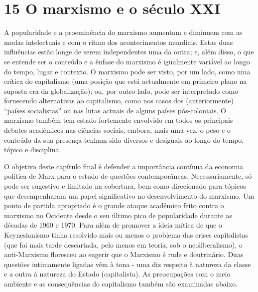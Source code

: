 \chapter{15 O marxismo e o século XXI}\label{15 O marxismo e o século XXI}
 \par 
A popularidade e a proeminência do marxismo aumentam e diminuem com as modas intelectuais e com o ritmo dos acontecimentos mundiais. Estas duas influências estão longe de serem independentes uma da outra; e, além disso, o que se entende ser o conteúdo e a ênfase do marxismo é igualmente variável ao longo do tempo, lugar e contexto. O marxismo pode ser visto, por um lado, como uma crítica do capitalismo (uma posição que está actualmente em primeiro plano na suposta era da globalização); ou, por outro lado, pode ser interpretado como fornecendo alternativas ao capitalismo, como nos casos dos (anteriormente) “países socialistas” ou nas lutas actuais de alguns países pós-coloniais. O marxismo também tem estado fortemente envolvido em todos os principais debates académicos nas ciências sociais, embora, mais uma vez, o peso e o conteúdo da sua presença tenham sido diversos e desiguais ao longo do tempo, tópico e disciplina.
 \par 
O objetivo deste capítulo final é defender a importância contínua da economia política de Marx para o estudo de questões contemporâneas. Necessariamente, só pode ser sugestivo e limitado na cobertura, bem como direcionado para tópicos que desempenharam um papel significativo no desenvolvimento do marxismo. Um ponto de partida apropriado é o grande ataque académico feito contra o marxismo no Ocidente desde o seu último pico de popularidade durante as décadas de 1960 e 1970. Para além de promover a ideia mítica de que o Keynesianismo tinha resolvido mais ou menos o problema das crises capitalistas (que foi mais tarde descartada, pelo menos em teoria, sob o neoliberalismo), o anti-Marxismo floresceu ao sugerir que o Marxismo é rude e doutrinário. Duas questões intimamente ligadas vêm à tona - uma diz respeito à natureza da classe e a outra à natureza do Estado (capitalista). As preocupações com o meio ambiente e as consequências do capitalismo também são examinadas abaixo.
 \par 
